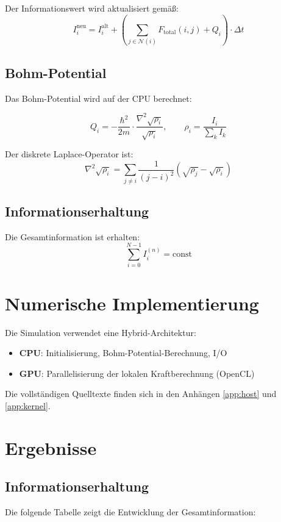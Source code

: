 \documentclass[12pt,a4paper]{article}
\begin{document}
Der Informationswert wird aktualisiert gemäß:
\[
I_i^{\text{neu}} = I_i^{\text{alt}} + \left( \sum_{j \in \mathcal{N}(i)} F_{\text{total}}(i,j) + Q_i \right) \cdot \Delta t
\]

\subsection{Bohm-Potential}

Das Bohm-Potential wird auf der CPU berechnet:

\[
Q_i = -\frac{\hbar^2}{2m} \cdot \frac{\nabla^2 \sqrt{\rho_i}}{\sqrt{\rho_i}}, \qquad \rho_i = \frac{I_i}{\sum_k I_k}
\]

Der diskrete Laplace-Operator ist:
\[
\nabla^2 \sqrt{\rho_i} = \sum_{j \neq i} \frac{1}{(j-i)^2} \left( \sqrt{\rho_j} - \sqrt{\rho_i} \right)
\]

\subsection{Informationserhaltung}

Die Gesamtinformation ist erhalten:
\[
\sum_{i=0}^{N-1} I_i^{(n)} = \text{const}
\]

\section{Numerische Implementierung}

Die Simulation verwendet eine Hybrid-Architektur:

\begin{itemize}
\item \textbf{CPU}: Initialisierung, Bohm-Potential-Berechnung, I/O
\item \textbf{GPU}: Parallelisierung der lokalen Kraftberechnung (OpenCL)
\end{itemize}

Die vollständigen Quelltexte finden sich in den Anhängen \ref{app:host} und \ref{app:kernel}.

\section{Ergebnisse}

\subsection{Informationserhaltung}

Die folgende Tabelle zeigt die Entwicklung der Gesamtinformation:
\end{document}
